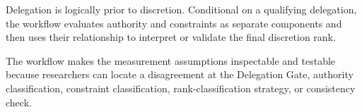 

Delegation is logically prior to discretion. Conditional on a
qualifying delegation, the workflow evaluates authority and constraints
as separate components and then uses their relationship to interpret or
validate the final discretion rank.




%
%

The workflow makes the measurement assumptions inspectable and
testable because researchers can locate a disagreement at the
Delegation Gate, authority classification, constraint classification,
rank-classification strategy, or consistency check.

%
%


%
%
%


